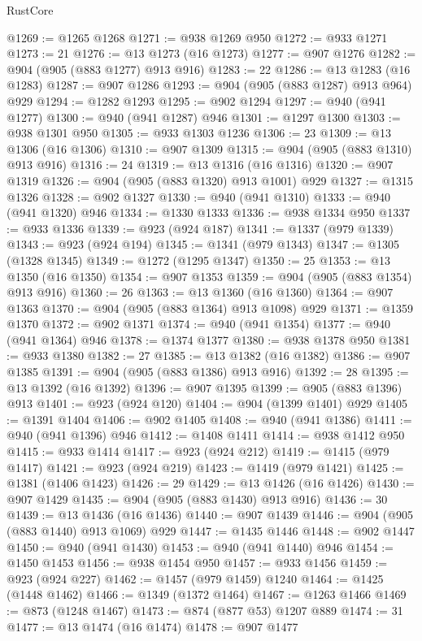 \begin{lexlean}{RustCore}
\begin{coremodule}
@1269 := @1265 @1268
@1271 := @938 @1269 @950
@1272 := @933 @1271
@1273 := 21
@1276 := @13 @1273 (@16 @1273)
@1277 := @907 @1276
@1282 := @904 (@905 (@883 @1277) @913 @916)
@1283 := 22
@1286 := @13 @1283 (@16 @1283)
@1287 := @907 @1286
@1293 := @904 (@905 (@883 @1287) @913 @964) @929
@1294 := @1282 @1293
@1295 := @902 @1294
@1297 := @940 (@941 @1277)
@1300 := @940 (@941 @1287) @946
@1301 := @1297 @1300
@1303 := @938 @1301 @950
@1305 := @933 @1303 @1236
@1306 := 23
@1309 := @13 @1306 (@16 @1306)
@1310 := @907 @1309
@1315 := @904 (@905 (@883 @1310) @913 @916)
@1316 := 24
@1319 := @13 @1316 (@16 @1316)
@1320 := @907 @1319
@1326 := @904 (@905 (@883 @1320) @913 @1001) @929
@1327 := @1315 @1326
@1328 := @902 @1327
@1330 := @940 (@941 @1310)
@1333 := @940 (@941 @1320) @946
@1334 := @1330 @1333
@1336 := @938 @1334 @950
@1337 := @933 @1336
@1339 := @923 (@924 @187)
@1341 := @1337 (@979 @1339)
@1343 := @923 (@924 @194)
@1345 := @1341 (@979 @1343)
@1347 := @1305 (@1328 @1345)
@1349 := @1272 (@1295 @1347)
@1350 := 25
@1353 := @13 @1350 (@16 @1350)
@1354 := @907 @1353
@1359 := @904 (@905 (@883 @1354) @913 @916)
@1360 := 26
@1363 := @13 @1360 (@16 @1360)
@1364 := @907 @1363
@1370 := @904 (@905 (@883 @1364) @913 @1098) @929
@1371 := @1359 @1370
@1372 := @902 @1371
@1374 := @940 (@941 @1354)
@1377 := @940 (@941 @1364) @946
@1378 := @1374 @1377
@1380 := @938 @1378 @950
@1381 := @933 @1380
@1382 := 27
@1385 := @13 @1382 (@16 @1382)
@1386 := @907 @1385
@1391 := @904 (@905 (@883 @1386) @913 @916)
@1392 := 28
@1395 := @13 @1392 (@16 @1392)
@1396 := @907 @1395
@1399 := @905 (@883 @1396) @913
@1401 := @923 (@924 @120)
@1404 := @904 (@1399 @1401) @929
@1405 := @1391 @1404
@1406 := @902 @1405
@1408 := @940 (@941 @1386)
@1411 := @940 (@941 @1396) @946
@1412 := @1408 @1411
@1414 := @938 @1412 @950
@1415 := @933 @1414
@1417 := @923 (@924 @212)
@1419 := @1415 (@979 @1417)
@1421 := @923 (@924 @219)
@1423 := @1419 (@979 @1421)
@1425 := @1381 (@1406 @1423)
@1426 := 29
@1429 := @13 @1426 (@16 @1426)
@1430 := @907 @1429
@1435 := @904 (@905 (@883 @1430) @913 @916)
@1436 := 30
@1439 := @13 @1436 (@16 @1436)
@1440 := @907 @1439
@1446 := @904 (@905 (@883 @1440) @913 @1069) @929
@1447 := @1435 @1446
@1448 := @902 @1447
@1450 := @940 (@941 @1430)
@1453 := @940 (@941 @1440) @946
@1454 := @1450 @1453
@1456 := @938 @1454 @950
@1457 := @933 @1456
@1459 := @923 (@924 @227)
@1462 := @1457 (@979 @1459) @1240
@1464 := @1425 (@1448 @1462)
@1466 := @1349 (@1372 @1464)
@1467 := @1263 @1466
@1469 := @873 (@1248 @1467)
@1473 := @874 (@877 @53) @1207 @889
@1474 := 31
@1477 := @13 @1474 (@16 @1474)
@1478 := @907 @1477

\end{coremodule}
\end{lexlean}
